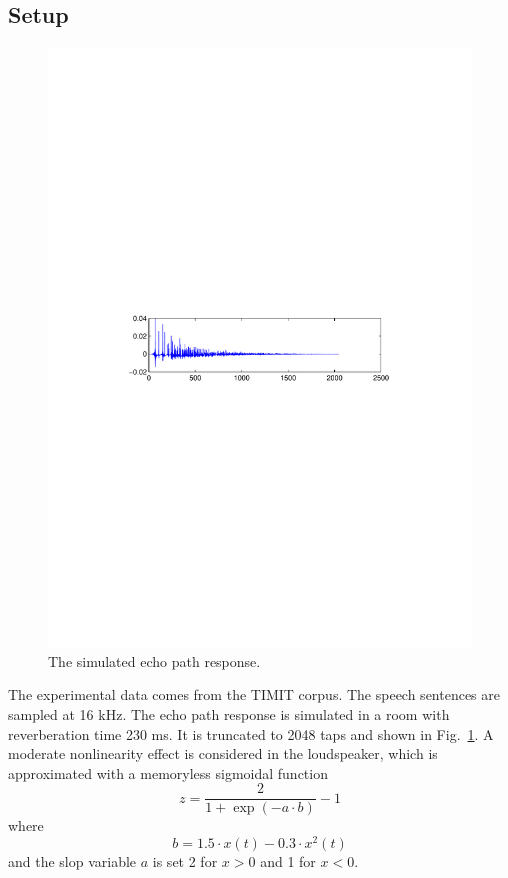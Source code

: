 \documentclass[a4paper]{article}
\begin{document}
\subsection{Setup}

\begin{figure}[t]
  \centering
  \includegraphics[width=\linewidth]{fig3_rir.pdf}
  \caption{The simulated echo path response.}
  \label{fig3}
\end{figure}

The experimental data comes from the TIMIT corpus. The speech sentences are sampled at 16 kHz. The echo path response is simulated in a room with reverberation time 230 ms. It is truncated to 2048 taps and shown in Fig.~\ref{fig3}. A moderate nonlinearity effect is considered in the loudspeaker, which is approximated with a memoryless sigmoidal function~\cite{comminiello2013functional}
\begin{equation}\label{eq:loud}
  z=\frac{2}{1+\exp(-a \cdot b)}-1
\end{equation}
where
\begin{equation}\label{eq:loudnl}
  b=1.5 \cdot x(t)-0.3 \cdot x^2(t)
\end{equation}
and the slop variable $a$ is set 2 for $x>0$ and 1 for $x<0$. 
\end{document}
